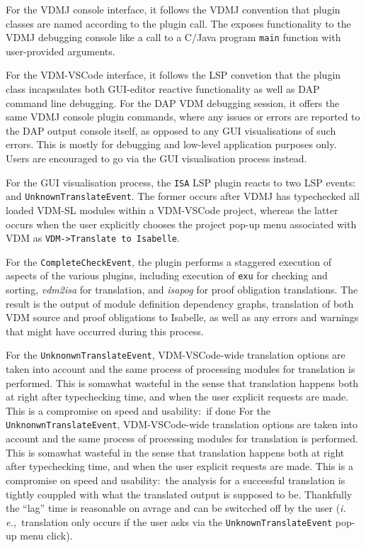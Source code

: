 \documentclass[runningheads,a4paper]{llncs}
\newcommand{\ie}{{\em i.\,e.,\/}}
\begin{document}
For the VDMJ console interface, it follows the VDMJ convention that plugin classes are named according to the plugin call. The exposes functionality to the VDMJ debugging console like a call to a C/Java program \texttt{main} function with user-provided arguments.   

For the VDM-VSCode interface, it follows the LSP convetion that the plugin class incapsulates both GUI-editor reactive functionality as well as DAP command line debugging. For the DAP VDM debugging session, it offers the same VDMJ console plugin commands, where any issues or errors are reported to the DAP output console itself, as opposed to any GUI visualisations of such errors. This is mostly for debugging and low-level application purposes only. Users are encouraged to go via the GUI visualisation process instead. 

For the GUI visualisation process, the \texttt{ISA} LSP plugin reacts to two LSP events:~ and \texttt{UnknownTranslateEvent}. The former occurs after VDMJ has typechecked all loaded VDM-SL modules within a VDM-VSCode project, whereas the latter occurs when the user explicitly chooses the project pop-up menu associated with VDM as {\verb'VDM->Translate to Isabelle'}. 

For the \texttt{CompleteCheckEvent}, the plugin performs a staggered execution of aspects of the various plugins, including execution of \texttt{exu} for checking and sorting, \textit{vdm2isa} for translation, and \textit{isapog} for proof obligation translations. The result is the output of module definition dependency graphs, translation of both VDM source and proof obligations to Isabelle, as well as any errors and warnings that might have occurred during this process. 

For the \texttt{UnknonwnTranslateEvent}, VDM-VSCode-wide translation options are taken into account and the same process of processing modules for translation is performed. This is somawhat wasteful in the sense that translation happens both at right after typechecking time, and when the user explicit requests are made. This is a compromise on speed and usability:~if done  
For the \texttt{UnknonwnTranslateEvent}, VDM-VSCode-wide translation options are taken into account and the same process of processing modules for translation is performed. This is somawhat wasteful in the sense that translation happens both at right after typechecking time, and when the user explicit requests are made. This is a compromise on speed and usability:~the analysis for a successful translation is tightly couppled with what the translated output is supposed to be. Thankfully the ``lag'' time is reasonable on avrage and can be switcched off by the user (\ie~translation only occurs if the user asks via the \texttt{UnknownTranslateEvent} pop-up menu click). 
\end{document}
